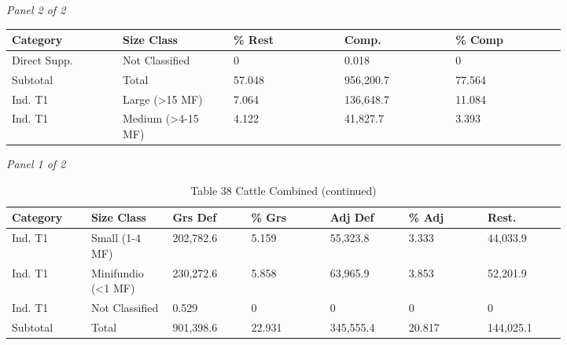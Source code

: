 \documentclass[12pt]{article}
\begin{document}
\begin{landscape}
\begin{table}[H]
\textit{Panel 2 of 2}\\[2pt]
{\fontsize{12}{14}\selectfont
\setlength{\tabcolsep}{3pt}
\renewcommand{\arraystretch}{1.08}
\begin{tabular}{p{0.164\linewidth}p{0.164\linewidth}p{0.164\linewidth}p{0.164\linewidth}p{0.164\linewidth}}
\toprule
Category & Size Class & \% Rest & Comp. & \% Comp \\
\midrule
Direct Supp. & Not Classified & 0 & 0.018 & 0 \\
Subtotal & Total & 57.048 & 956,200.7 & 77.564 \\
Ind. T1 & Large (>15 MF) & 7.064 & 136,648.7 & 11.084 \\
Ind. T1 & Medium (>4-15 MF) & 4.122 & 41,827.7 & 3.393 \\
\bottomrule
\end{tabular}
}
\end{table}
\begin{table}[H]
\centering
\caption{Table 38 Cattle Combined (continued)}
\textit{Panel 1 of 2}\\[2pt]
{\fontsize{12}{14}\selectfont
\setlength{\tabcolsep}{3pt}
\renewcommand{\arraystretch}{1.08}
\begin{tabular}{p{0.117\linewidth}p{0.117\linewidth}p{0.117\linewidth}p{0.117\linewidth}p{0.117\linewidth}p{0.117\linewidth}p{0.117\linewidth}}
\toprule
Category & Size Class & Grs Def & \% Grs & Adj Def & \% Adj & Rest. \\
\midrule
Ind. T1 & Small (1-4 MF) & 202,782.6 & 5.159 & 55,323.8 & 3.333 & 44,033.9 \\
Ind. T1 & Minifundio (<1 MF) & 230,272.6 & 5.858 & 63,965.9 & 3.853 & 52,201.9 \\
Ind. T1 & Not Classified & 0.529 & 0 & 0 & 0 & 0 \\
Subtotal & Total & 901,398.6 & 22.931 & 345,555.4 & 20.817 & 144,025.1 \\
\bottomrule
\end{tabular}
}

\vspace{0.6em}


\end{table}
\end{landscape}
\end{document}

